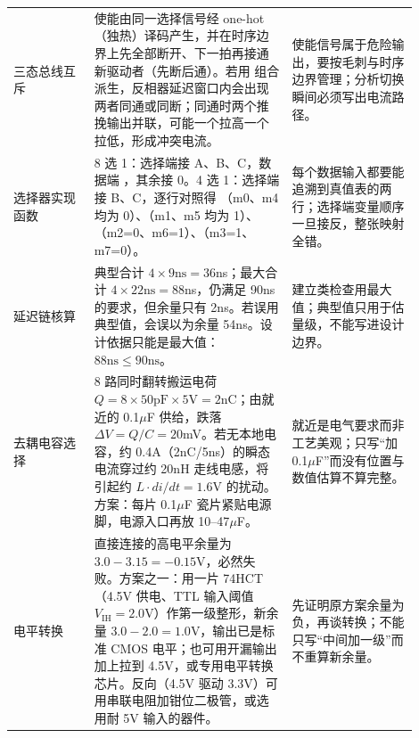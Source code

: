 \begin{longtable}{L{0.18\linewidth}L{0.44\linewidth}L{0.28\linewidth}}
三态总线互斥 & 使能由同一选择信号经 one-hot（独热）译码产生，并在时序边界上先全部断开、下一拍再接通新驱动者（先断后通）。若用  组合派生，反相器延迟窗口内会出现两者同通或同断；同通时两个推挽输出并联，可能一个拉高一个拉低，形成冲突电流。 & 使能信号属于危险输出，要按毛刺与时序边界管理；分析切换瞬间必须写出电流路径。 \\
选择器实现函数 & 8 选 1：选择端接 A、B、C，数据端 ，其余接 0。4 选 1：选择端接 B、C，逐行对照得 （m0、m4 均为 0）、（m1、m5 均为 1）、（m2=0、m6=1）、（m3=1、m7=0）。 & 每个数据输入都要能追溯到真值表的两行；选择端变量顺序一旦接反，整张映射全错。 \\
延迟链核算 & 典型合计 $4\times9\mathrm{ns}=36$ns；最大合计 $4\times22\mathrm{ns}=88$ns，仍满足 90ns 的要求，但余量只有 2ns。若误用典型值，会误以为余量 54ns。设计依据只能是最大值：$88\mathrm{ns}\le90\mathrm{ns}$。 & 建立类检查用最大值；典型值只用于估量级，不能写进设计边界。 \\
去耦电容选择 & 8 路同时翻转搬运电荷 $Q=8\times50\mathrm{pF}\times5\mathrm{V}=2$nC；由就近的 0.1$\mu$F 供给，跌落 $\Delta V=Q/C=20$mV。若无本地电容，约 0.4A（2nC/5ns）的瞬态电流穿过约 20nH 走线电感，将引起约 $L\cdot di/dt=1.6$V 的扰动。方案：每片 0.1$\mu$F 瓷片紧贴电源脚，电源入口再放 10–47$\mu$F。 & 就近是电气要求而非工艺美观；只写“加 0.1$\mu$F”而没有位置与数值估算不算完整。 \\
电平转换 & 直接连接的高电平余量为 $3.0-3.15=-0.15$V，必然失败。方案之一：用一片 74HCT（4.5V 供电、TTL 输入阈值 $V_\mathrm{IH}=2.0$V）作第一级整形，新余量 $3.0-2.0=1.0$V，输出已是标准 CMOS 电平；也可用开漏输出加上拉到 4.5V，或专用电平转换芯片。反向（4.5V 驱动 3.3V）可用串联电阻加钳位二极管，或选用耐 5V 输入的器件。 & 先证明原方案余量为负，再谈转换；不能只写“中间加一级”而不重算新余量。 \\
\bottomrule
\end{longtable}

